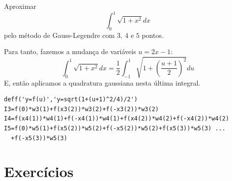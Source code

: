 \begin{ex} Aproximar
$$\int_{0}^1\sqrt{1+x^2}dx$$
pelo método de Gauss-Legendre com $3,\ 4$ e $5$ pontos.
\end{ex}
\begin{sol}
Para tanto, fazemos a mudança de variáveis $u=2x-1$:
\begin{equation*}
  \int_{0}^1\sqrt{1+x^2}dx=\frac{1}{2}\int_{-1}^1\sqrt{1+\left(\frac{u+1}{2}\right)^2}du
\end{equation*}
E, então aplicamos a quadratura gaussiana nesta última integral.
\ifisscilab
\begin{verbatim}
deff('y=f(u)','y=sqrt(1+(u+1)^2/4)/2')
I3=f(0)*w3(1)+f(x3(2))*w3(2)+f(-x3(2))*w3(2)
I4=f(x4(1))*w4(1)+f(-x4(1))*w4(1)+f(x4(2))*w4(2)+f(-x4(2))*w4(2)
I5=f(0)*w5(1)+f(x5(2))*w5(2)+f(-x5(2))*w5(2)+f(x5(3))*w5(3) ...
  +f(-x5(3))*w5(3)
\end{verbatim}
\fi  
\end{sol}

\section*{Exercícios}

